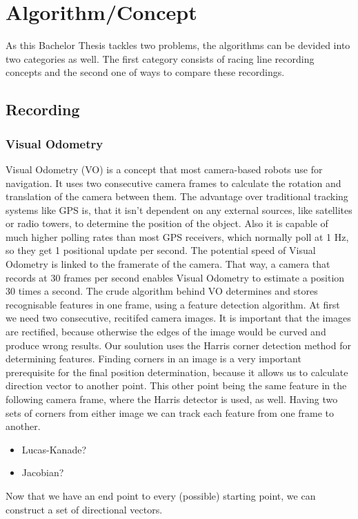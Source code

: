 \section{Algorithm/Concept}
\label{sec:algorithm}
As this Bachelor Thesis tackles two problems, the algorithms can be devided into two categories as well.
The first category consists of racing line recording concepts and the second one of ways to compare these recordings.

\subsection{Recording}
\subsubsection{Visual Odometry}
Visual Odometry (VO) is a concept that most camera-based robots use for navigation. It uses two consecutive camera frames to calculate the rotation and translation of the camera between them. The advantage over traditional tracking systems like GPS is, that it isn't dependent on any external sources, like satellites or radio towers, to determine the position of the object.
Also it is capable of much higher polling rates than most GPS receivers, which normally poll at 1 Hz, so they get 1 positional update per second. The potential speed of Visual Odometry is linked to the framerate of the camera. That way, a camera that records at 30 frames per second enables Visual Odometry to estimate a position 30 times a second. 
The crude algorithm behind VO determines and stores recognisable features in one frame, using a feature detection algorithm.
At first we need two consecutive, recitifed camera images. It is important that the images are rectified, because otherwise the edges of the image would be curved and produce wrong results.
Our soulution uses the Harris corner detection method for determining features. Finding corners in an image is a very important prerequisite for the final position determination, because it allows us to calculate direction vector to another point. This other point being the same feature in the following camera frame, where the Harris detector is used, as well.
Having two sets of corners from either image we can track each feature from one frame to another. 
\begin{itemize}
    \item Lucas-Kanade?
    \item Jacobian?
\end{itemize}
Now that we have an end point to every (possible) starting point, we can construct a set of directional vectors.
